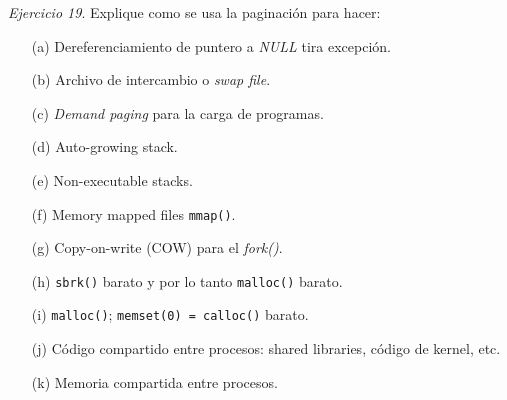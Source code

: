 \documentclass[12pt]{article}
\begin{document}
\noindent \textit{Ejercicio 19}. Explique como se usa la paginación para hacer:

\begin{itemize}
    \item[(a)] Dereferenciamiento de puntero a \textit{NULL} tira excepción.
    \item[(b)] Archivo de intercambio o \textit{swap file}.
    \item[(c)] \textit{Demand paging} para la carga de programas.
    \item[(d)] Auto-growing stack.
    \item[(e)] Non-executable stacks.
    \item[(f)] Memory mapped files \texttt{mmap()}.
    \item[(g)] Copy-on-write (COW) para el \textit{fork()}.
    \item[(h)] \texttt{sbrk()} barato y por lo tanto \texttt{malloc()} barato.
    \item[(i)] \texttt{malloc()}; \texttt{memset(0) = calloc()} barato.
    \item[(j)] Código compartido entre procesos: shared libraries, código de kernel, etc. 
    \item[(k)] Memoria compartida entre procesos. 
\end{itemize}
\end{document}
